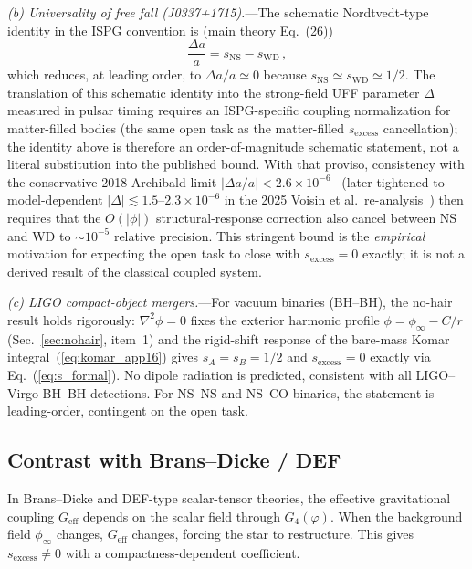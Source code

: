 \documentclass[11pt]{article}
\begin{document}
\textit{(b) Universality of free fall (J0337+1715).}---The
schematic Nordtvedt-type identity in the ISPG convention
is (main theory Eq.~(26))
\begin{equation}\label{eq:nordtvedt_app16}
  \frac{\Delta a}{a} = s_{\mathrm{NS}} - s_{\mathrm{WD}}\,,
\end{equation}
which reduces, at leading order, to $\Delta a/a \simeq 0$
because $s_{\mathrm{NS}}\simeq s_{\mathrm{WD}}\simeq 1/2$.
The translation of this schematic identity into the
strong-field UFF parameter $\Delta$ measured in pulsar
timing requires an ISPG-specific coupling normalization
for matter-filled bodies (the same open task as the
matter-filled $s_{\mathrm{excess}}$ cancellation); the
identity above is therefore an order-of-magnitude
schematic statement, not a literal substitution into the
published bound.  With that proviso, consistency with
the conservative 2018 Archibald limit
$|\Delta a/a| < 2.6\times10^{-6}$~\cite{Archibald2018}
(later tightened to model-dependent
$|\Delta| \lesssim 1.5$--$2.3\times10^{-6}$ in the 2025
Voisin et al.\ re-analysis~\cite{Voisin2025}) then
requires that the $O(|\phi|)$ structural-response
correction also cancel between NS and WD to
$\sim 10^{-5}$ relative precision.  This stringent bound
is the \emph{empirical} motivation for expecting the
open task to close with $s_{\mathrm{excess}} = 0$
exactly; it is not a derived result of the classical
coupled system.

\textit{(c) LIGO compact-object mergers.}---For vacuum
binaries (BH--BH), the no-hair result holds rigorously:
$\nabla^2\phi = 0$ fixes the exterior harmonic profile
$\phi=\phi_\infty-C/r$ (Sec.~\ref{sec:nohair}, item~1)
and the rigid-shift response of the bare-mass Komar
integral~(\ref{eq:komar_app16}) gives
$s_A = s_B = 1/2$ and $s_{\mathrm{excess}} = 0$ exactly
via Eq.~(\ref{eq:s_formal}).  No dipole radiation is
predicted, consistent with all LIGO--Virgo BH--BH
detections.  For NS--NS and NS--CO binaries, the statement
is leading-order, contingent on the open task.

\subsection{Contrast with Brans--Dicke / DEF}

In Brans--Dicke and DEF-type scalar-tensor theories, the
effective gravitational coupling $G_{\mathrm{eff}}$ depends
on the scalar field through $G_4(\varphi)$.  When the
background field $\phi_\infty$ changes, $G_{\mathrm{eff}}$
changes, forcing the star to restructure.  This gives
$s_{\mathrm{excess}} \neq 0$ with a compactness-dependent
coefficient.
\end{document}
